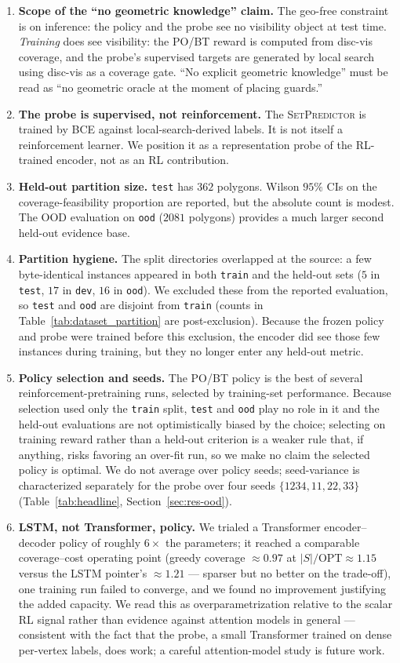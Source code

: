 \documentclass[preprint,10pt]{elsarticle}
\newcommand{\OPT}{\mathrm{OPT}}
\newcommand{\SetPredictor}{\textup{\textsc{SetPredictor}}}
\begin{document}
\begin{enumerate}
  \item \textbf{Scope of the ``no geometric knowledge'' claim.} The geo-free constraint is on inference: the policy and the probe see no visibility object at test time. \emph{Training} does see visibility: the PO/BT reward is computed from disc-vis coverage, and the probe's supervised targets are generated by local search using disc-vis as a coverage gate. ``No explicit geometric knowledge'' must be read as ``no geometric oracle at the moment of placing guards.''
  \item \textbf{The probe is supervised, not reinforcement.} The \SetPredictor{} is trained by BCE against local-search-derived labels. It is not itself a reinforcement learner. We position it as a representation probe of the RL-trained encoder, not as an RL contribution.
  \item \textbf{Held-out partition size.} \texttt{test} has $362$ polygons. Wilson $95\%$ CIs on the coverage-feasibility proportion are reported, but the absolute count is modest. The OOD evaluation on \texttt{ood} ($2081$ polygons) provides a much larger second held-out evidence base.
  \item \textbf{Partition hygiene.} The split directories overlapped at the source: a few byte-identical instances appeared in both \texttt{train} and the held-out sets ($5$ in \texttt{test}, $17$ in \texttt{dev}, $16$ in \texttt{ood}). We excluded these from the reported evaluation, so \texttt{test} and \texttt{ood} are disjoint from \texttt{train} (counts in Table~\ref{tab:dataset_partition} are post-exclusion). Because the frozen policy and probe were trained before this exclusion, the encoder did see those few instances during training, but they no longer enter any held-out metric.
  \item \textbf{Policy selection and seeds.} The PO/BT policy is the best of several reinforcement-pretraining runs, selected by training-set performance. Because selection used only the \texttt{train} split, \texttt{test} and \texttt{ood} play no role in it and the held-out evaluations are not optimistically biased by the choice; selecting on training reward rather than a held-out criterion is a weaker rule that, if anything, risks favoring an over-fit run, so we make no claim the selected policy is optimal. We do not average over policy seeds; seed-variance is characterized separately for the probe over four seeds $\{1234, 11, 22, 33\}$ (Table~\ref{tab:headline}, Section~\ref{sec:res-ood}).
  \item \textbf{LSTM, not Transformer, policy.} We trialed a Transformer encoder--decoder policy of roughly $6\times$ the parameters; it reached a comparable coverage--cost operating point (greedy coverage $\approx 0.97$ at $|S|/\OPT \approx 1.15$ versus the LSTM pointer's $\approx 1.21$ --- sparser but no better on the trade-off), one training run failed to converge, and we found no improvement justifying the added capacity. We read this as overparametrization relative to the scalar RL signal rather than evidence against attention models in general --- consistent with the fact that the probe, a small Transformer trained on dense per-vertex labels, does work; a careful attention-model study is future work.

\end{enumerate}
\end{document}
